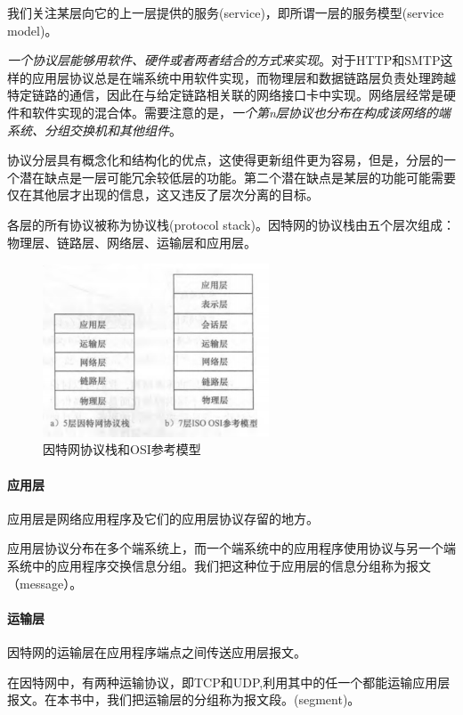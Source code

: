    我们关注某层向它的上一层提供的服务(service)，即所谓一层的服务模型(service model)。

    \emph{一个协议层能够用软件、硬件或者两者结合的方式来实现}。对于HTTP和SMTP这样的应用层协议总是在端系统中用软件实现，而物理层和数据链路层负责处理跨越特定链路的通信，因此在与给定链路相关联的网络接口卡中实现。网络层经常是硬件和软件实现的混合体。需要注意的是，\emph{一个第n层协议也分布在构成该网络的端系统、分组交换机和其他组件}。

    协议分层具有概念化和结构化的优点，这使得更新组件更为容易，但是，分层的一个潜在缺点是一层可能冗余较低层的功能。第二个潜在缺点是某层的功能可能需要仅在其他层才出现的信息，这又违反了层次分离的目标。

    各层的所有协议被称为协议栈(protocol stack)。因特网的协议栈由五个层次组成：物理层、链路层、网络层、运输层和应用层。

\begin{figure}[!htbp]
    \centering
    \includegraphics[width=0.6\textwidth]{image/chapter01/协议栈模型.png}
    \caption{因特网协议栈和OSI参考模型}
\end{figure}

\paragraph{应用层} 应用层是网络应用程序及它们的应用层协议存留的地方。

    应用层协议分布在多个端系统上，而一个端系统中的应用程序使用协议与另一个端系统中的应用程序交换信息分组。我们把这种位于应用层的信息分组称为报文（message）。

\paragraph{运输层} 因特网的运输层在应用程序端点之间传送应用层报文。

    在因特网中，有两种运输协议，即TCP和UDP,利用其中的任一个都能运输应用层报文。在本书中，我们把运输层的分组称为报文段。(segment)。

